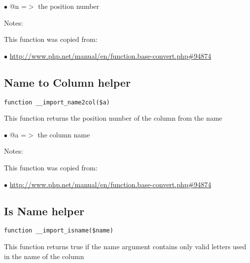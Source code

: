 \documentclass[a4paper]{book}
\def\htmladdnormallink#1#2{\href{#2}{#1}}
\begin{document}
\begin{compactitem}
\item[\color{myblue}$\bullet$] @n =$>$ the position number
\end{compactitem}

Notes:

This function was copied from:

\begin{compactitem}
\item[\color{myblue}$\bullet$] \htmladdnormallink{http://www.php.net/manual/en/function.base-convert.php\#94874}{http://www.php.net/manual/en/function.base-convert.php\#94874}
\end{compactitem}

\hypertarget{toc166}{}
\subsection{Name to Column helper}

\begin{lstlisting}
function __import_name2col($a)
\end{lstlisting}

This function returns the position number of the column from the name

\begin{compactitem}
\item[\color{myblue}$\bullet$] @a =$>$ the column name
\end{compactitem}

Notes:

This function was copied from:

\begin{compactitem}
\item[\color{myblue}$\bullet$] \htmladdnormallink{http://www.php.net/manual/en/function.base-convert.php\#94874}{http://www.php.net/manual/en/function.base-convert.php\#94874}
\end{compactitem}

\hypertarget{toc167}{}
\subsection{Is Name helper}

\begin{lstlisting}
function __import_isname($name)
\end{lstlisting}

This function returns true if the name argument contains only valid letters
used in the name of the column
\end{document}
